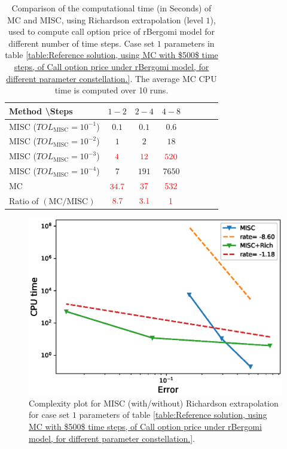 \begin{table}[!h]
	\centering
	\begin{tabular}{l*{6}{c}r}
		Method \textbackslash  Steps            & $1-2$ & $2-4$ & $4-8$   \\
		\hline
		MISC ($TOL_{\text{MISC}}=10^{-1}$)  & $0.1$ & $0.1$ & $0.6$ \\
		MISC ($TOL_{\text{MISC}}=10^{-2}$)  & $1$ & $2$ & $18$   \\
		MISC ($TOL_{\text{MISC}}=10^{-3}$)  & ${\color{red}4}$ & ${\color{red}12}$ & ${\color{red}520}$   \\	
		MISC ($TOL_{\text{MISC}}=10^{-4}$)  & $7$ & $191$ & $7650$  \\
		\hline
		MC   & ${\color{red} 34.7}$  & ${\color{red}37}$  & $ {\color{red}532}$    \\
		
		\hline
		Ratio of $\left(\text{MC}/ \text{MISC} \right)$  &${\color{red}8.7}$ & ${\color{red}   3.1
		}$  & ${\color{red}1}$ \\
		\hline
	\end{tabular}
	\caption{Comparison of the computational time (in Seconds) of  MC and MISC, using Richardson extrapolation (level $1$), used to compute call option price of rBergomi model for different number of time steps. Case set $1$ parameters in table \ref{table:Reference solution, using MC with $500$ time steps, of Call option price under rBergomi model, for different parameter constellation.}. The
		average MC CPU time is computed over 10 runs.}
	\label{Comparsion of the computational time of  MC and MISC, using Richardson extrapolation (level $1$), used to compute Call option price of rBergomi model for different number of time steps. Case set $1$ parameters}
\end{table}



\begin{figure}[h!]
	\centering
	\includegraphics[width=0.5\linewidth]{./figures/rBergomi_Complexity_rates/set1/error_vs_time_set1_comparison}
	
	\caption{Complexity plot for  MISC (with/without) Richardson extrapolation for case set $1$ parameters of table \ref{table:Reference solution, using MC with $500$ time steps, of Call option price under rBergomi model, for different parameter constellation.}.}
	\label{fig:Complexity plot for  MISC for Case set $1$ parameters, comparison}
\end{figure}
\FloatBarrier

